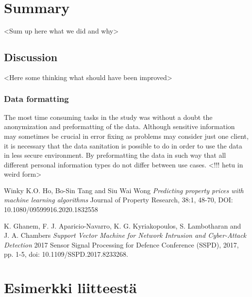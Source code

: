 \documentclass[english, 12pt, a4paper, elec, utf8, a-1b, online]{aaltothesis}
\begin{document}
\clearpage

\section{Summary}

<Sum up here what we did and why>

\subsection{Discussion}
<Here some thinking what should have been improved>

\subsubsection*{Data formatting}
The most time consuming tasks in the study
was without a doubt
the anonymization and preformatting of the data.
Although sensitive information may sometimes be crucial in error fixing
as problems may consider just one client,
it is necessary that the data sanitation is possible to do
in order to use the data in less secure environment.
By preformatting the data in such way
that all different personal information types
do not differ between use cases.
<!!! hetu in weird form>


\clearpage





\thesisbibliography

\begin{thebibliography}{99}
   Winky K.O. Ho, Bo-Sin Tang and Siu Wai Wong
    \textit{Predicting property prices with machine learning algorithms}
  Journal of Property Research, 38:1, 48-70, DOI: 10.1080/09599916.2020.1832558

   K. Ghanem, F. J. Aparicio-Navarro, K. G. Kyriakopoulos, S. Lambotharan and J. A. Chambers
    \textit{Support Vector Machine for Network Intrusion and Cyber-Attack Detection}
  2017 Sensor Signal Processing for Defence Conference (SSPD), 2017, pp. 1-5, doi: 10.1109/SSPD.2017.8233268.

\end{thebibliography}

\clearpage

\thesisappendix

\section{Esimerkki liitteestä\label{LiiteA}}


\clearpage
\end{document}
